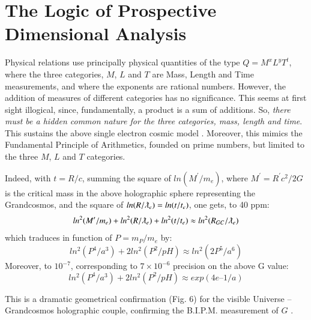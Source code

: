 \documentclass[twoside,draft]{article}
\begin{document}
\begin{sloppypar}
\section{The Logic of Prospective Dimensional Analysis}

Physical relations use principally physical quantities of the type $Q = M^{x} L^{y} T^{t}$, where
the three categories, $M$, $L$ and $T$ are Mass, Length and Time measurements, and where the exponents are
rational numbers. However, the addition of measures of different categories has no significance.
This seems at first sight illogical, since, fundamentally, a product is a sum of additions. So, \textit{there
must be a hidden common nature for the three categories, mass, length and time}. This sustains the
above single electron cosmic model \cite{Sanchez1}. Moreover, this mimics the Fundamental Principle of
Arithmetics, founded on prime numbers, but limited to the three $M$, $L$ and $T$ categories. 

Indeed, with $t =
R/c$, summing the square of $ln(M^{\prime}/m_{e} )$, where $M^{\prime} = R^{\prime} c^{2} /2G$ is the critical mass in the above
holographic sphere representing the Grandcosmos, and the square of $ln(R/\lambdabar_{e} ) = ln(t/t_{e} )$, one gets, to 40 ppm:
\begin{equation}
ln^{2} (M^{\prime}/m_{e} ) + ln^{2} (R/\lambdabar_{e}) + ln^2 (t/t_{e} ) \approx ln^2 (R_{GC} /\lambdabar_{e} )
\end{equation} which traduces in function of $P = m_P/m_e$ by:
\begin{equation}
ln^2(P^4/a^3) + 2 ln^2(P^2/pH) \approx ln^2(2P^5/a^6)
\end{equation}
Moreover, to $10^{-7}$, corresponding to $7 \times 10^{-6}$ precision on the above G value:
\begin{equation}
ln^2(P^4/a^3) + 2 ln^2(P^2/pH) \approx exp(4e – 1/a)
\end{equation}
 
This is a dramatic geometrical confirmation (Fig. 6) for the visible Universe – Grandcosmos holographic couple, confirming the B.I.P.M. measurement of $G$ \cite{Quinn}.



\end{sloppypar}
\end{document}
